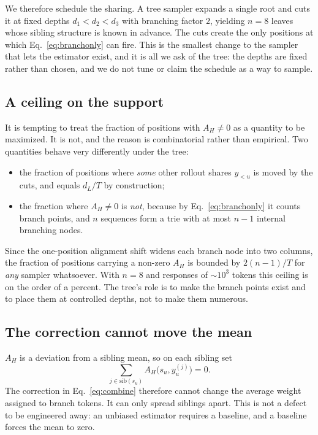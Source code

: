 \documentclass[11pt]{article}
\newcommand{\AH}{A_{H}}
\begin{document}
We therefore schedule the sharing. A tree sampler expands a single root and cuts it
at fixed depths $d_1 < d_2 < d_3$ with branching factor $2$, yielding $n = 8$ leaves
whose sibling structure is known in advance. The cuts create the only positions at
which Eq.~\eqref{eq:branchonly} can fire. This is the smallest change to the sampler
that lets the estimator exist, and it is all we ask of the tree: the depths are
fixed rather than chosen, and we do not tune or claim the schedule as a way to
sample.

\subsection{A ceiling on the support}

It is tempting to treat the fraction of positions with $\AH \neq 0$ as a quantity to
be maximized. It is not, and the reason is combinatorial rather than empirical. Two
quantities behave very differently under the tree:

\begin{itemize}
\item the fraction of positions where \emph{some} other rollout shares $y_{<u}$ is
      moved by the cuts, and equals $d_L/T$ by construction;
\item the fraction where $\AH \neq 0$ is \emph{not}, because by
      Eq.~\eqref{eq:branchonly} it counts branch points, and $n$ sequences form a
      trie with at most $n-1$ internal branching nodes.
\end{itemize}

Since the one-position alignment shift widens each branch node into two columns, the
fraction of positions carrying a non-zero $\AH$ is bounded by $2(n-1)/T$ for
\emph{any} sampler whatsoever. With $n = 8$ and responses of $\sim 10^3$ tokens this
ceiling is on the order of a percent. The tree's role is to make the branch points
exist and to place them at controlled depths, not to make them numerous.

\subsection{The correction cannot move the mean}
\label{sec:zerosum}

$\AH$ is a deviation from a sibling mean, so on each sibling set
%
\begin{equation}
\sum_{j \in \mathrm{sib}(s_u)} \AH\bigl(s_u, y^{(j)}_u\bigr) = 0 .
\label{eq:zerosum}
\end{equation}
%
The correction in Eq.~\eqref{eq:combine} therefore cannot change the average weight
assigned to branch tokens. It can only spread siblings apart. This is not a defect
to be engineered away: an unbiased estimator requires a baseline, and a baseline
forces the mean to zero.
\end{document}
